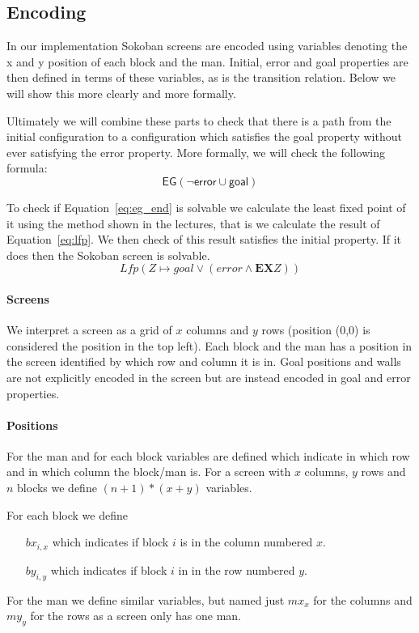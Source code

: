 \subsection{Encoding} \label{sec:encoding}
In our implementation Sokoban screens are encoded using variables denoting the
x and y position of each block and the man. Initial, error and goal properties
are then defined in terms of these variables, as is the transition relation. 
Below we will show this more clearly and more formally.

Ultimately we will combine these parts to check that there is a path from the
initial configuration to a configuration which satisfies the goal property 
without ever satisfying the error property. More formally, we will check the
following formula:
\begin{equation}\label{eq:eg_end}
	\mathsf{EG (\neg error \cup goal)}
\end{equation}

To check if Equation~\ref{eq:eg_end} is solvable we calculate the least fixed 
point of it using the method shown in the lectures, that is we
calculate the result of Equation~\ref{eq:lfp}. We then check of this result
satisfies the initial property. If it does then the Sokoban screen is solvable.
\begin{equation}\label{eq:lfp}
	Lfp(Z \mapsto goal \vee (error \wedge \mathbf{EX} Z))
\end{equation}

\paragraph{Screens} We interpret a screen as a grid of $x$ columns and $y$ rows
(position (0,0) is considered the position in the top left).
Each block and the man has a position in the screen identified by which row and
column it is in. Goal positions and walls are not explicitly encoded in the 
screen but are instead encoded in goal and error properties.

\paragraph{Positions} For the man and for each block variables are defined which
indicate in which row and in which column the block/man is. For a screen with
$x$ columns, $y$ rows and $n$ blocks we define $(n+1)*(x+y)$ 
variables. 

For each block we define
\begin{itemize}
	\item[$bx_{i,x}$] which indicates if block $i$ is in the column numbered $x$.
	\item[$by_{i,y}$] which indicates if block $i$ in in the row numbered $y$.
\end{itemize}
For the man we define similar variables, but named just $mx_x$ for the columns
and $my_y$ for the rows as a screen only has one man.

